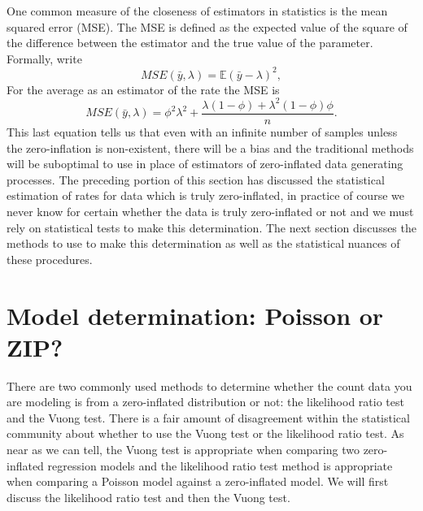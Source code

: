 \documentclass{article}
\begin{document}
One common measure of the closeness of estimators in statistics is the mean squared error (MSE). The MSE is defined as the expected value of the square of the difference between the estimator and the true value of the parameter. Formally, write 
\begin{equation}
MSE(\bar{y}, \lambda) = \mathbb{E}(\bar{y}-\lambda)^2,
\end{equation}
For the average as an estimator of the rate the MSE is 
\begin{equation}
MSE(\bar{y}, \lambda) = \phi^2\lambda^2 + \frac{ \lambda(1-\phi) +\lambda^2(1-\phi)\phi}{n}.
\end{equation}
This last equation tells us that even with an infinite number of samples unless the zero-inflation is non-existent, there will be a bias and the traditional methods will be suboptimal to use in place of estimators of zero-inflated data generating processes. The preceding portion of this section has discussed the statistical estimation of rates for data which is truly zero-inflated, in practice of course we never know for certain whether the data is truly zero-inflated or not and we must rely on statistical tests to make this determination. The next section discusses the methods to use to make this determination as well as the statistical nuances of these procedures.
 
\section{Model determination: Poisson or ZIP?}
There are two commonly used methods to determine whether the count data you are modeling is from a zero-inflated distribution or not: the likelihood ratio test and the Vuong test.  
There is a fair amount of disagreement within the statistical community about whether to use the Vuong test or the likelihood ratio test. As near as we can tell, the Vuong test is appropriate when comparing two zero-inflated regression models and the likelihood ratio test method is appropriate when comparing a Poisson model against a zero-inflated model. 
We will first discuss the likelihood ratio test and then the Vuong test. 
\end{document}
